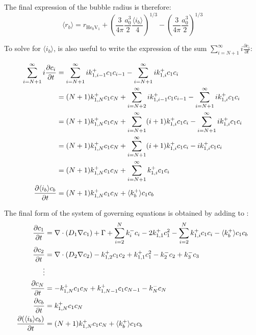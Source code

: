 The final expression of the bubble radius is therefore:
\begin{equation}
    \langle r_b \rangle = r_{\mathrm{He}_0 \mathrm{V}_1} + \left(\frac{3}{4 \pi} \frac{a_0^3}{2} \frac{\langle i_b \rangle}{4} \right)^{1/3} - \left(\frac{3}{4 \pi} \frac{a_0^3}{2} \right)^{1/3}
\end{equation}

To solve for $\langle i_b \rangle$, is also useful to write the expression of the sum $\sum\limits_{i=N+1}^\infty i \frac{\partial c_i}{\partial t}$:

\begin{align}
    \sum\limits_{i=N+1}^\infty i \frac{\partial c_i}{\partial t} &= \sum\limits_{i=N+1}^\infty i k_{1,i-1}^+ c_1 c_{i-1} - \sum\limits_{i=N+1}^\infty i k_{1,i}^+ c_1 c_{i} \nonumber\\
    &= (N+1) k_{1,N}^+ c_1 c_N + \sum\limits_{i=N+2}^\infty i k_{1,i-1}^+ c_1 c_{i-1} - \sum\limits_{i=N+1}^\infty i k_{1,i}^+ c_1 c_{i} \nonumber\\
    &= (N+1) k_{1,N}^+ c_1 c_N + \sum\limits_{i=N+1}^\infty (i + 1) k_{1,i}^+ c_1 c_{i} - \sum\limits_{i=N+1}^\infty i k_{1,i}^+ c_1 c_{i} \nonumber\\
    &= (N+1) k_{1,N}^+ c_1 c_N + \sum\limits_{i=N+1}^\infty (i + 1) k_{1,i}^+ c_1 c_{i} - i k_{1,i}^+ c_1 c_{i} \nonumber\\
    &= (N+1) k_{1,N}^+ c_1 c_N + \sum\limits_{i=N+1}^\infty k_{1,i}^+ c_1 c_{i} \nonumber\\
    \frac{\partial \langle i_b \rangle c_b}{\partial t} &= (N+1) k_{1,N}^+ c_1 c_N + \langle k_b^+ \rangle c_1 c_b
    \labeq{pde for d (cb ib)/ dt}
\end{align}

The final form of the system of governing equations is obtained by adding  to :
\begin{subequations}
    \begin{align}
        \frac{\partial c_1}{\partial t} &= \nabla \cdot (D_1 \nabla c_1) + \Gamma + \sum\limits_{i=2}^N k_{i}^- c_i- 2k_{1, 1}^+ c_1^2 - \sum\limits_{i=2}^N k_{1,i}^+ c_1 c_i - \langle k_b^+ \rangle c_1 c_b \labeq{final system of equation: c1}\\
        \frac{\partial c_2}{\partial t} &= \nabla \cdot (D_2 \nabla c_2) - k_{1, 2}^+ c_1 c_2 + k_{1, 1}^+ c_1^2 - k_{2}^- c_2 + k_{3}^- c_3\\
        \vdots \nonumber\\
        \frac{\partial c_N}{\partial t} &= - k_{1, N}^+ c_1 c_N + k_{1, N-1}^+ c_1 c_{N-1} - k_{N}^- c_N\\
        \frac{\partial c_b}{\partial t} &= k_ {1,N}^+ c_1 c_N \\
        \frac{\partial (\langle i_b \rangle c_b)}{\partial t} &= (N+1)k_ {1,N}^+ c_1 c_N  + \langle k_b^+ \rangle c_1 c_b \labeq{final system of equation: ib cb}
    \end{align}
    \labeq{final system of equation}
\end{subequations}

